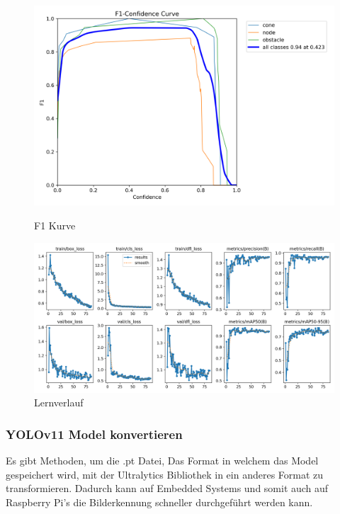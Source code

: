 \begin{figure}[H]
    \begin{minipage}[b]{0.48\textwidth}
    \centering
    \includegraphics[width=\textwidth]{assets/IT/yolo/F1_curve.png}
    \caption{F1 Kurve}
    \label{fig:f1}
  \end{minipage}
    \hfill
  \begin{minipage}[b]{0.48\textwidth}
    \centering
    \includegraphics[width=\textwidth]{assets/IT/yolo/results.png}
    \caption{Lernverlauf}
    \label{fig:results-lernverlauf}
  \end{minipage}
\end{figure}

\subsubsection{YOLOv11 Model konvertieren}
\label{convert-yolo}

Es gibt Methoden, um die .pt Datei, Das Format in welchem das Model gespeichert wird, mit der Ultralytics Bibliothek in ein anderes Format zu transformieren. Dadurch kann auf Embedded Systems und somit auch auf Raspberry Pi's die Bilderkennung schneller durchgeführt werden kann.

